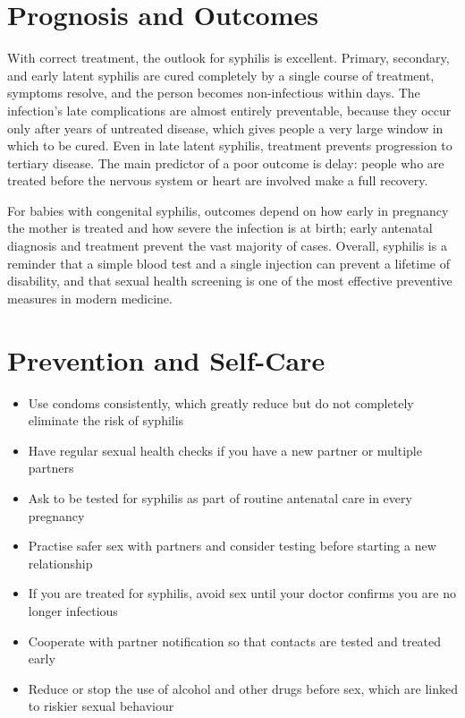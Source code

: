 \section*{Prognosis and Outcomes}
With correct treatment, the outlook for syphilis is excellent. Primary, secondary, and early latent syphilis are cured completely by a single course of treatment, symptoms resolve, and the person becomes non-infectious within days. The infection's late complications are almost entirely preventable, because they occur only after years of untreated disease, which gives people a very large window in which to be cured. Even in late latent syphilis, treatment prevents progression to tertiary disease. The main predictor of a poor outcome is delay: people who are treated before the nervous system or heart are involved make a full recovery.

For babies with congenital syphilis, outcomes depend on how early in pregnancy the mother is treated and how severe the infection is at birth; early antenatal diagnosis and treatment prevent the vast majority of cases. Overall, syphilis is a reminder that a simple blood test and a single injection can prevent a lifetime of disability, and that sexual health screening is one of the most effective preventive measures in modern medicine.

\section*{Prevention and Self-Care}
\begin{itemize}
    \item Use condoms consistently, which greatly reduce but do not completely eliminate the risk of syphilis
    \item Have regular sexual health checks if you have a new partner or multiple partners
    \item Ask to be tested for syphilis as part of routine antenatal care in every pregnancy
    \item Practise safer sex with partners and consider testing before starting a new relationship
    \item If you are treated for syphilis, avoid sex until your doctor confirms you are no longer infectious
    \item Cooperate with partner notification so that contacts are tested and treated early
    \item Reduce or stop the use of alcohol and other drugs before sex, which are linked to riskier sexual behaviour
\end{itemize}

